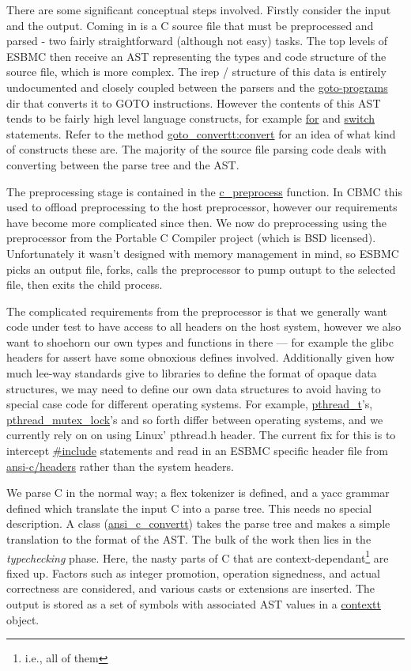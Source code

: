 \documentclass{article}
\begin{document}
There are some significant conceptual steps involved. Firstly consider
the input and the output. Coming in is a C source file that must be preprocessed
and parsed - two fairly straightforward (although not easy) tasks. The top
levels of ESBMC then receive an AST representing the types and code structure
of the source file, which is more complex. The irep / structure of this data
is entirely undocumented and closely coupled between the parsers and the
\url{goto-programs} dir that converts it to GOTO instructions. However the
contents of this AST tends to be fairly high level language constructs,
for example \url{for} and \url{switch} statements. Refer to the method
\url{goto_convertt:convert} for an idea of what kind of constructs these
are. The majority of the source file parsing code deals with converting between
the parse tree and the AST.

The preprocessing stage is contained in the \url{c_preprocess} function.
In CBMC this used to offload preprocessing to the host preprocessor, however
our requirements have become more complicated since then. We now do
preprocessing using the preprocessor from the Portable C Compiler project
(which is BSD licensed). Unfortunately it wasn't designed with memory management
in mind, so ESBMC picks an output file, forks, calls the preprocessor to pump
outupt to the selected file, then exits the child process.

The complicated requirements from the preprocessor is that we generally want
code under test to have access to all headers on the host system, however we
also want to shoehorn our own types and functions in there --- for example the
glibc headers for assert have some obnoxious defines involved. Additionally
given how much lee-way standards give to libraries to define the format of
opaque data structures, we may need to define our own data structures to
avoid having to special case code for different operating systems. For example,
\url{pthread_t}'s, \url{pthread_mutex_lock}'s and so forth differ
between operating systems, and we currently rely on on using Linux' pthread.h
header. The current fix for this is to intercept \url{\#include} statements
and read in an ESBMC specific header file from \url{ansi-c/headers} rather
than the system headers.

We parse C in the normal way; a flex tokenizer is defined, and a yacc grammar
defined which translate the input C into a parse tree. This needs no special
description. A class (\url{ansi_c_convertt}) takes the parse tree and
makes a simple translation to the format of the AST. The bulk of the work then
lies in the \textit{typechecking} phase. Here, the nasty parts of C that are
context-dependant\footnote{i.e., all of them} are fixed up. Factors such as
integer promotion, operation signedness, and actual correctness are
considered, and various casts or extensions are inserted. The output is stored
as a set of symbols with associated AST values in a \url{contextt} object.
\end{document}
